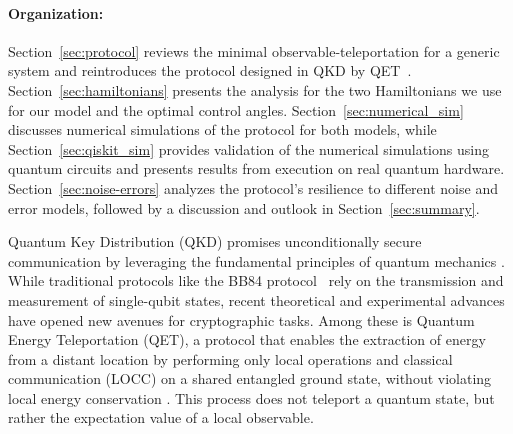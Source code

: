{\paragraph{Organization:} Section~\ref{sec:protocol} reviews the minimal observable-teleportation for a generic system and reintroduces the protocol designed in QKD by QET~\cite{QKDbyQET}. Section~\ref{sec:hamiltonians} presents the analysis for the two Hamiltonians we use for our model and the optimal control angles. Section~\ref{sec:numerical_sim} discusses numerical simulations of the protocol for both models, while Section~\ref{sec:qiskit_sim} provides validation of the numerical simulations using quantum circuits and presents results from execution on real quantum hardware. Section~\ref{sec:noise-errors} analyzes the protocol's resilience to different noise and error models, followed by a discussion and outlook in Section~\ref{sec:summary}.

}\fi

Quantum Key Distribution (QKD) promises unconditionally secure communication by leveraging the fundamental principles of quantum mechanics \cite{Bennett1984, Ekert1991}. While traditional protocols like the BB84 protocol~\cite{Bennett1984, Bennett1984Original, Bennett1992, Shor2000, Mayers2001, Scarani2009, Bennett1992_exp, Pirandola2020} rely on the transmission and measurement of single-qubit states, recent theoretical and experimental advances have opened new avenues for cryptographic tasks. Among these is Quantum Energy Teleportation (QET), a protocol that enables the extraction of energy from a distant location by performing only local operations and classical communication (LOCC) on a shared entangled ground state, without violating local energy conservation \cite{Hotta2011, Amico2008}. This process does not teleport a quantum state, but rather the expectation value of a local observable.

